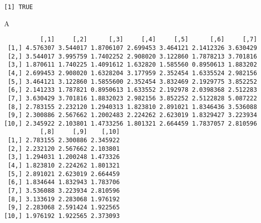 \documentclass[]{article}
\newenvironment{Shaded}{\begin{snugshade}}{\end{snugshade}}
\newcommand{\KeywordTok}[1]{\textcolor[rgb]{0.13,0.29,0.53}{\textbf{#1}}}
\newcommand{\DataTypeTok}[1]{\textcolor[rgb]{0.13,0.29,0.53}{#1}}
\newcommand{\DecValTok}[1]{\textcolor[rgb]{0.00,0.00,0.81}{#1}}
\newcommand{\FloatTok}[1]{\textcolor[rgb]{0.00,0.00,0.81}{#1}}
\newcommand{\StringTok}[1]{\textcolor[rgb]{0.31,0.60,0.02}{#1}}
\newcommand{\CommentTok}[1]{\textcolor[rgb]{0.56,0.35,0.01}{\textit{#1}}}
\newcommand{\OperatorTok}[1]{\textcolor[rgb]{0.81,0.36,0.00}{\textbf{#1}}}
\newcommand{\NormalTok}[1]{#1}
\begin{document}
\begin{Shaded}
\end{Shaded}

\begin{verbatim}
[1] TRUE
\end{verbatim}

\begin{Shaded}
\begin{Highlighting}[]
\NormalTok{A}
\end{Highlighting}
\end{Shaded}

\begin{verbatim}
          [,1]     [,2]      [,3]     [,4]     [,5]      [,6]     [,7]
 [1,] 4.576307 3.544017 1.8706107 2.699453 3.464121 2.1412326 3.630429
 [2,] 3.544017 3.995759 1.7402252 2.908020 3.122860 1.7878213 3.701816
 [3,] 1.870611 1.740225 1.4091612 1.632820 1.585560 0.8950613 1.883202
 [4,] 2.699453 2.908020 1.6328204 3.177959 2.352454 1.6335524 2.982156
 [5,] 3.464121 3.122860 1.5855600 2.352454 3.832469 2.1929775 3.852252
 [6,] 2.141233 1.787821 0.8950613 1.633552 2.192978 2.0398368 2.512283
 [7,] 3.630429 3.701816 1.8832023 2.982156 3.852252 2.5122828 5.087222
 [8,] 2.783155 2.232120 1.2940313 1.823810 2.891021 1.8346436 3.536088
 [9,] 2.300886 2.567662 1.2002483 2.224262 2.623019 1.8329427 3.223934
[10,] 2.345922 2.103801 1.4733256 1.801321 2.664459 1.7837057 2.810596
          [,8]     [,9]    [,10]
 [1,] 2.783155 2.300886 2.345922
 [2,] 2.232120 2.567662 2.103801
 [3,] 1.294031 1.200248 1.473326
 [4,] 1.823810 2.224262 1.801321
 [5,] 2.891021 2.623019 2.664459
 [6,] 1.834644 1.832943 1.783706
 [7,] 3.536088 3.223934 2.810596
 [8,] 3.133619 2.283068 1.976192
 [9,] 2.283068 2.591424 1.922565
[10,] 1.976192 1.922565 2.373093
\end{verbatim}
\end{document}

